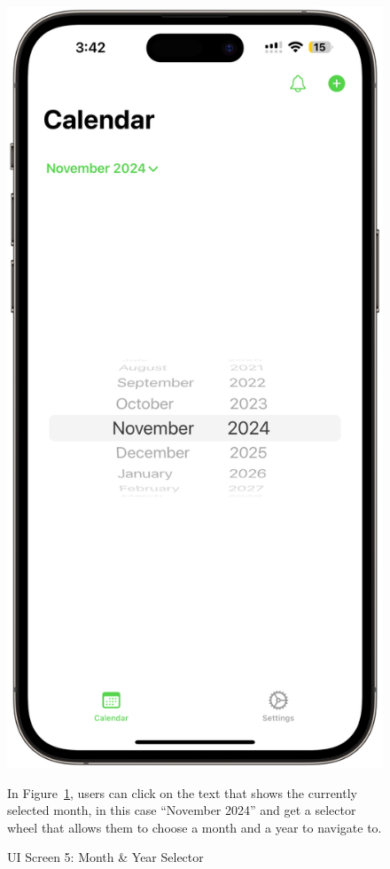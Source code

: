 \begin{figure}[!h]
    \begin{minipage}{0.3\textwidth}
        \centering
        \includegraphics[width=\textwidth]{images/screen5.png}
        \caption{UI Screen 5: Month \& Year Selector}
        \label{fig:ui-screen-5}
    \end{minipage}
    \hfill
    \begin{minipage}{0.65\textwidth}
        In Figure~\ref{fig:ui-screen-5}, users can click on the text that shows the currently selected month, in this case ``November 2024'' and get a selector wheel that allows them to choose a month and a year to navigate to.
    \end{minipage}
\end{figure}

